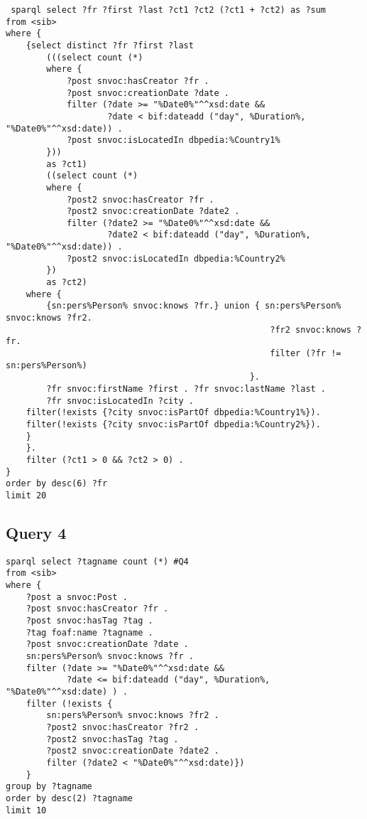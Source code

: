 \begin{verbatim}
 sparql select ?fr ?first ?last ?ct1 ?ct2 (?ct1 + ?ct2) as ?sum 
from <sib>  
where { 
    {select distinct ?fr ?first ?last
        (((select count (*)
        where {
            ?post snvoc:hasCreator ?fr .
            ?post snvoc:creationDate ?date .
            filter (?date >= "%Date0%"^^xsd:date && 
                    ?date < bif:dateadd ("day", %Duration%, "%Date0%"^^xsd:date)) .
            ?post snvoc:isLocatedIn dbpedia:%Country1%
        }))
        as ?ct1)
        ((select count (*)
        where {
            ?post2 snvoc:hasCreator ?fr .
            ?post2 snvoc:creationDate ?date2 . 
            filter (?date2 >= "%Date0%"^^xsd:date && 
                    ?date2 < bif:dateadd ("day", %Duration%, "%Date0%"^^xsd:date)) .
            ?post2 snvoc:isLocatedIn dbpedia:%Country2%
        })
        as ?ct2)
    where {
        {sn:pers%Person% snvoc:knows ?fr.} union { sn:pers%Person% snvoc:knows ?fr2.
                                                    ?fr2 snvoc:knows ?fr.
                                                    filter (?fr != sn:pers%Person%)
                                                }.
        ?fr snvoc:firstName ?first . ?fr snvoc:lastName ?last .
        ?fr snvoc:isLocatedIn ?city .
    filter(!exists {?city snvoc:isPartOf dbpedia:%Country1%}).
    filter(!exists {?city snvoc:isPartOf dbpedia:%Country2%}).
    }
    }.
    filter (?ct1 > 0 && ?ct2 > 0) .
}
order by desc(6) ?fr
limit 20
\end{verbatim}

 

\subsection{Query 4}
\begin{verbatim}
sparql select ?tagname count (*) #Q4
from <sib>
where {
    ?post a snvoc:Post .
    ?post snvoc:hasCreator ?fr .
    ?post snvoc:hasTag ?tag .
    ?tag foaf:name ?tagname .
    ?post snvoc:creationDate ?date . 
    sn:pers%Person% snvoc:knows ?fr .
    filter (?date >= "%Date0%"^^xsd:date && 
            ?date <= bif:dateadd ("day", %Duration%, "%Date0%"^^xsd:date) ) .
    filter (!exists {
        sn:pers%Person% snvoc:knows ?fr2 .
        ?post2 snvoc:hasCreator ?fr2 .
        ?post2 snvoc:hasTag ?tag .
        ?post2 snvoc:creationDate ?date2 .
        filter (?date2 < "%Date0%"^^xsd:date)}) 
    }
group by ?tagname
order by desc(2) ?tagname
limit 10
\end{verbatim}



